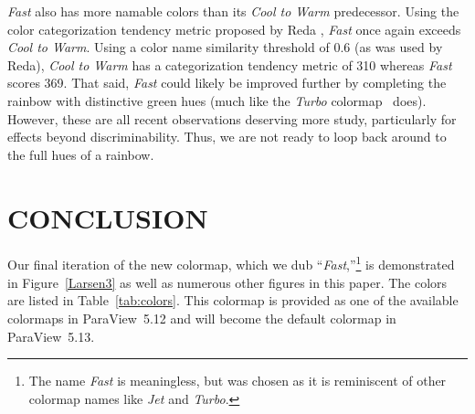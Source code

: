 \documentclass{IEEEcsmag}
\newcommand*{\colormap}[1]{\textsl{#1}\xspace}
\newcommand*{\coolwarm}{\colormap{Cool to Warm}}
\newcommand*{\fast}{\colormap{Fast}}
\newcommand*{\turbo}{\colormap{Turbo}}
\begin{document}
\fast also has more namable colors than its \coolwarm predecessor.
Using the color categorization tendency metric proposed by Reda \cite{Reda2022}, \fast once again exceeds \coolwarm.
Using a color name similarity threshold of 0.6 (as was used by Reda), \coolwarm has a categorization tendency metric of 310 whereas \fast scores 369.
That said, \fast could likely be improved further by completing the rainbow with distinctive green hues (much like the \turbo colormap~\cite{Mikhailov2019} does).
However, these are all recent observations deserving more study, particularly for effects beyond discriminability.
Thus, we are not ready to loop back around to the full hues of a rainbow.


\section{CONCLUSION}

Our final iteration of the new colormap, which we dub ``\fast,''\footnote{The name \fast is meaningless, but was chosen as it is reminiscent of other colormap names like \colormap{Jet} and \turbo.} is demonstrated in Figure~\ref{Larsen3} as well as numerous other figures in this paper.
The colors are listed in Table~\ref{tab:colors}.
This colormap is provided as one of the available colormaps in ParaView~5.12 and will become the default colormap in ParaView~5.13.


\newcommand*{\colordemo}[1]{\colorbox{#1}{\phantom{X}}}
\end{document}
